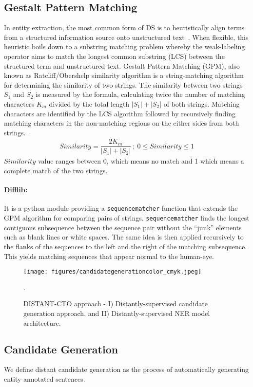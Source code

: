 \documentclass[letterpaper]{article} %
\begin{document}
\subsection{Gestalt Pattern Matching}
\label{subsec_gsp}
%
In entity extraction, the most common form of DS is to heuristically align terms from a structured information source onto unstructured text~\cite{wen2019efficient}.
When flexible, this heuristic boils down to a substring matching problem whereby the weak-labeling operator aims to match the longest common substring (LCS) between the structured term and unstructured text.
Gestalt Pattern Matching (GPM), also known as Ratcliff/Obershelp similarity algorithm is a string-matching algorithm for determining the similarity of two strings.
The similarity between two strings $S_{1}$ and $S_{2}$ is measured by the formula, calculating twice the number of matching characters $K_{m}$ divided by the total length $|S_{1}| + |S_{2}|$ of both strings.
Matching characters are identified by the LCS algorithm followed by recursively finding matching characters in the non-matching regions on the either sides from both strings.~\cite{ratcliff1988pattern}.
%
\begin{gather}
  Similarity = \dfrac{ 2 K_{m}}{|S_{1}| + |S_{2}|} \: ; \: 0 \leq	 Similarity \leq	 1
\end{gather}
%
$Similarity$ value ranges between 0, which means no match and 1 which means a complete match of the two strings.
%
\paragraph{Difflib: }
It is a python module providing a {\tt sequencematcher} function that extends the GPM algorithm for comparing pairs of strings.
{\tt sequencematcher} finds the longest contiguous subsequence between the sequence pair without the ``junk'' elements such as blank lines or white spaces.
The same idea is then applied recursively to the flanks of the sequences to the left and the right of the matching subsequence.
This yields matching sequences that appear normal to the human-eye.
%
\begin{figure*}[ht]
\centering
\texttt{[image: figures/candidategenerationcolor\_cmyk.jpeg]} 
\caption{DISTANT-CTO approach - I) Distantly-supervised candidate generation approach, and II) Distantly-supervised NER model architecture.}.
\label{method:approach}
\end{figure*}
%
\subsection{Candidate Generation}
\label{subsec:candgen}
%
We define distant candidate generation as the process of automatically generating entity-annotated sentences.
%
\end{document}
